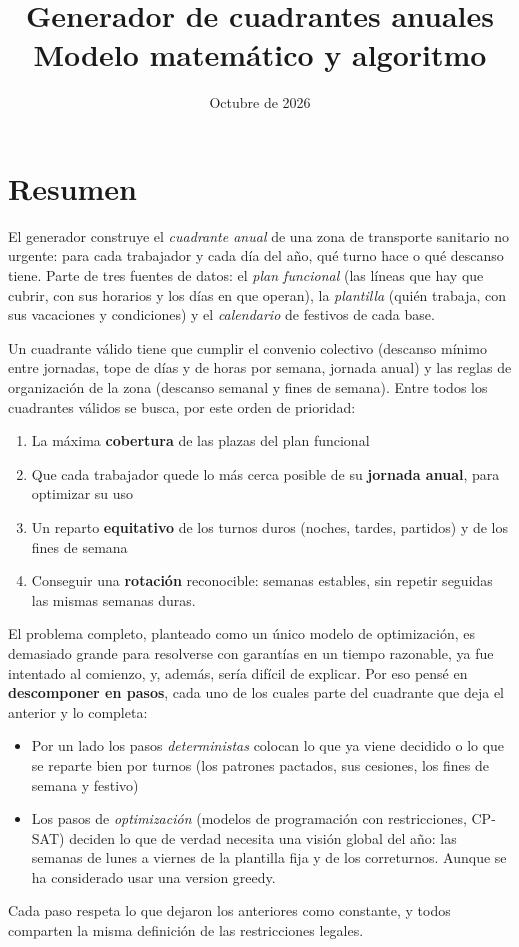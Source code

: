 \documentclass[11pt,a4paper]{article}
\title{Generador de cuadrantes anuales\\[0.3em]
       \large Modelo matemático y algoritmo}
\author{}
\date{Octubre de 2026}
\begin{document}
\maketitle

\section{Resumen}

El generador construye el \emph{cuadrante anual} de una zona de transporte sanitario no urgente:
para cada trabajador y cada día del año, qué turno hace o qué descanso tiene. Parte de tres
fuentes de datos: el \emph{plan funcional} (las líneas que hay que cubrir, con sus horarios y los
días en que operan), la \emph{plantilla} (quién trabaja, con sus vacaciones y condiciones) y el
\emph{calendario} de festivos de cada base.

Un cuadrante válido tiene que cumplir el convenio colectivo (descanso mínimo entre jornadas,
tope de días y de horas por semana, jornada anual) y las reglas de organización de la zona
(descanso semanal y fines de semana). Entre todos los
cuadrantes válidos se busca, por este orden de prioridad:
\begin{enumerate}[nosep]
  \item La máxima \textbf{cobertura} de las plazas del plan funcional
  \item Que cada trabajador quede lo más cerca posible de su \textbf{jornada anual}, para optimizar su uso
  \item Un reparto \textbf{equitativo} de los turnos duros (noches, tardes, partidos) y de los
        fines de semana
  \item Conseguir una \textbf{rotación} reconocible: semanas estables, sin repetir seguidas las mismas
        semanas duras.
\end{enumerate}

El problema completo, planteado como un único modelo de optimización, es demasiado grande para
resolverse con garantías en un tiempo razonable, ya fue intentado al comienzo, y, además, sería difícil de explicar. Por eso pensé en
\textbf{descomponer en pasos}, cada uno de los cuales parte del cuadrante que deja el anterior y lo
completa:
\begin{itemize}[nosep]
  \item Por un lado los pasos \emph{deterministas} colocan lo que ya viene decidido o lo que se reparte bien
        por turnos (los patrones pactados, sus cesiones, los fines de semana y festivo)
  \item Los pasos de \emph{optimización} (modelos de programación con restricciones, CP-SAT)
        deciden lo que de verdad necesita una visión global del año: las semanas de lunes a
        viernes de la plantilla fija y de los correturnos. Aunque se ha considerado usar una version greedy.
\end{itemize}
Cada paso respeta lo que dejaron los anteriores como constante, y todos comparten la misma
definición de las restricciones legales.
\end{document}
